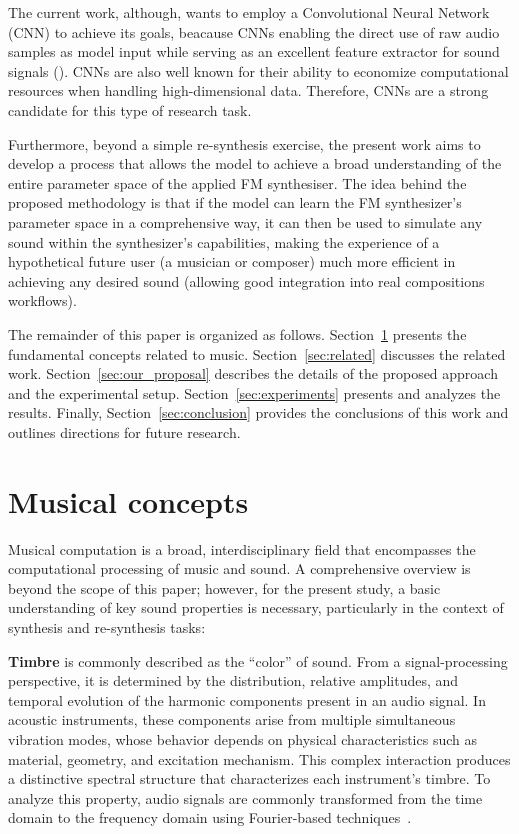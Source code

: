 \documentclass[10pt,conference]{IEEEtran}
\begin{document}
The current work, although, wants to employ a Convolutional Neural Network (CNN) to achieve its goals, beacause CNNs enabling the direct use of raw audio samples as model input while serving as an excellent feature extractor for sound signals (\cite{kiranyaz2021survey}). CNNs are also well known for their ability to economize computational resources when handling high-dimensional data. Therefore, CNNs are a strong candidate for this type of research task.

Furthermore, beyond a simple re-synthesis exercise, the present work aims to develop a process that allows the model to achieve a broad understanding of the entire parameter space of the applied FM synthesiser. The idea behind the proposed methodology is that if the model can learn the FM synthesizer’s parameter space in a comprehensive way, it can then be used to simulate any sound within the synthesizer’s capabilities, making the experience of a hypothetical future user (a musician or composer) much more efficient in achieving any desired sound (allowing good integration into real compositions workflows).

The remainder of this paper is organized as follows. Section~\ref{sec:fund} presents the fundamental concepts related to music. Section~\ref{sec:related} discusses the related work. Section~\ref{sec:our_proposal} describes the details of the proposed approach and the experimental setup. Section~\ref{sec:experiments} presents and analyzes the results. Finally, Section~\ref{sec:conclusion} provides the conclusions of this work and outlines directions for future research.

\section{Musical concepts} \label{sec:fund}

Musical computation is a broad, interdisciplinary field that encompasses the computational processing of music and sound. A comprehensive overview is beyond the scope of this paper; however, for the present study, a basic understanding of key sound properties is necessary, particularly in the context of synthesis and re-synthesis tasks:

\textbf{Timbre} is commonly described as the ``color'' of sound. From a signal-processing perspective, it is determined by the distribution, relative amplitudes, and temporal evolution of the harmonic components present in an audio signal. In acoustic instruments, these components arise from multiple simultaneous vibration modes, whose behavior depends on physical characteristics such as material, geometry, and excitation mechanism. This complex interaction produces a distinctive spectral structure that characterizes each instrument’s timbre. To analyze this property, audio signals are commonly transformed from the time domain to the frequency domain using Fourier-based techniques~\cite{benson2008music}.
\end{document}
